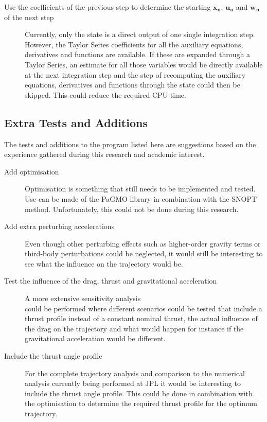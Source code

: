 \begin{description}
\item[Use the coefficients of the previous step to determine the starting $\mathbf{x_{n}}$, $\mathbf{u_{n}}$ and $\mathbf{w_{n}}$ of the next step] Currently, only the state is a direct output of one single integration step. However, the Taylor Series coefficients for all the auxiliary equations, derivatives and functions are available. If these are expanded through a Taylor Series, an estimate for all those variables would be directly available at the next integration step and the step of recomputing the auxiliary equations, derivatives and functions through the state could then be skipped. This could reduce the required CPU time.

\end{description}



\subsection{Extra Tests and Additions}
\label{subsec:extraTestsAndAdditions}
The tests and additions to the program listed here are suggestions based on the experience gathered during this research and academic interest. 

\begin{description}
\item[Add optimisation] Optimisation is something that still needs to be implemented and tested. Use can be made of the \ac{PaGMO} library in combination with the \ac{SNOPT} method. Unfortunately, this could not be done during this research.
\item[Add extra perturbing accelerations] Even though other perturbing effects such as higher-order gravity terms or third-body perturbations could be neglected, it would still be interesting to see what the influence on the trajectory would be.
\item[Test the influence of the drag, thrust and gravitational acceleration] A more extensive sensitivity analysis \\
could be performed where different scenarios could be tested that include a thrust profile instead of a constant nominal thrust, the actual influence of the drag on the trajectory and what would happen for instance if the gravitational acceleration would be different.
\item[Include the thrust angle profile] For the complete trajectory analysis and comparison to the numerical analysis currently being performed at \ac{JPL} it would be interesting to include the thrust angle profile. This could be done in combination with the optimisation to determine the required thrust profile for the optimum trajectory.

\end{description}
